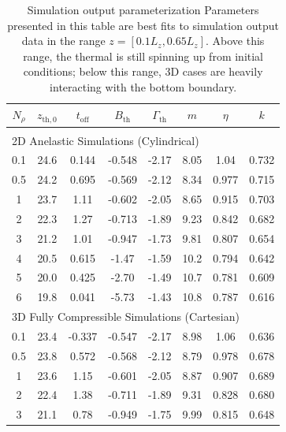 \begin{table}
\caption[Measured values of important quantities in the thermal evolution theory from simulation data.]
{Simulation output parameterization
\label{table:parameters}
Parameters presented in this table are best fits to simulation output data in the range $z = [0.1 L_z, 0.65 L_z]$.
Above this range, the thermal is still spinning up from initial conditions; below this range, 3D cases are heavily interacting with the bottom boundary.
}
\begin{center}
\begin{tabular}{c c c c c c c c}
$N_\rho$ & $z_{\text{th},0}$ & $t_{\text{off}}$ & $B_{\text{th}}$ & $\Gamma_{\text{th}}$ & $m$ & $\eta$ & $k$ \\
\hline\hline\\
\multicolumn{8}{l}{2D Anelastic Simulations (Cylindrical)}\\
0.1 	&  24.6 	& 0.144	& -0.548 & -2.17 & 8.05	& 1.04	& 0.732	\\
0.5 	&  24.2 	& 0.695	& -0.569 & -2.12 & 8.34	& 0.977	& 0.715	\\
1	 	&  23.7 	& 1.11 	& -0.602 & -2.05 & 8.65	& 0.915	& 0.703	\\
2	 	&  22.3 	& 1.27	& -0.713 & -1.89 & 9.23	& 0.842 & 0.682	\\
3	 	&  21.2 	& 1.01	& -0.947 & -1.73 & 9.81	& 0.807	& 0.654	\\
4	 	&  20.5 	& 0.615	& -1.47	 & -1.59 & 10.2	& 0.794	& 0.642	\\
5	 	&  20.0	    & 0.425	& -2.70	 & -1.49 & 10.7	& 0.781	& 0.609	\\
6	 	&  19.8 	& 0.041	& -5.73	 & -1.43 & 10.8	& 0.787	& 0.616	\\
\multicolumn{8}{l}{3D Fully Compressible Simulations (Cartesian)}\\    
0.1 	&  23.4 	& -0.337& -0.547 & -2.17 & 8.98	& 1.06	& 0.636	\\
0.5 	&  23.8 	& 0.572	& -0.568 & -2.12 & 8.79	& 0.978	& 0.678	\\
1	 	&  23.6 	& 1.15	& -0.601 & -2.05 & 8.87	& 0.907	& 0.689	\\
2	 	&  22.4 	& 1.38	& -0.711 & -1.89 & 9.31	& 0.828	& 0.680	\\
3	 	&  21.1 	& 0.78	& -0.949 & -1.75 & 9.99	& 0.815	& 0.648	\\
\hline
\end{tabular}
\end{center}
\end{table}



